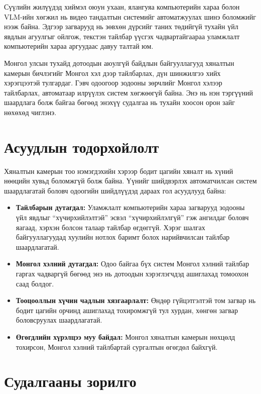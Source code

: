 Сүүлийн жилүүдэд хиймэл оюун ухаан, ялангуяа компьютерийн хараа болон VLM-ийн хөгжил нь видео тандалтын системийг автоматжуулах шинэ боломжийг нээж байна. Эдгээр загварууд нь зөвхөн дүрсийг таних төдийгүй тухайн үйл явдлын агуулгыг ойлгож, текстэн тайлбар үүсгэх чадвартайгаараа уламжлалт компьютерийн хараа аргуудаас давуу талтай юм.

Монгол улсын тухайд дотоодын аюулгүй байдлын байгууллагууд хяналтын камерын бичлэгийг Монгол хэл дээр тайлбарлах, дүн шинжилгээ хийх хэрэгцээтэй тулгардаг. Гэвч одоогоор зодооны зөрчлийг Монгол хэлээр тайлбарлах, автоматаар илрүүлэх систем хөгжөөгүй байна. Энэ нь нэн тэргүүний шаардлага болж байгаа бөгөөд энэхүү судалгаа нь тухайн хоосон орон зайг нөхөхөд чиглэнэ.

\section{Асуудлын тодорхойлолт}

Хяналтын камерын тоо нэмэгдэхийн хэрээр бодит цагийн хяналт нь хүний нөөцийн хувьд боломжгүй болж байна. Үүнийг шийдвэрлэх автоматчилсан систем шаардлагатай боловч одоогийн шийдлүүдэд дараах гол асуудлууд байна:

\begin{itemize}
    \item \textbf{Тайлбарын дутагдал:} Уламжлалт компьютерийн хараа загварууд зодооны үйл явдлыг ``хүчирхийлэлтэй'' эсвэл ``хүчирхийлэлгүй'' гэж ангилдаг боловч яагаад, хэрхэн болсон талаар тайлбар өгдөггүй. Хэрэг шалгах байгууллагуудад хуулийн нотлох баримт болох нарийвчилсан тайлбар шаардлагатай.
        \item \textbf{Монгол хэлний дутагдал:} Одоо байгаа бүх систем Монгол хэлний тайлбар гаргах чадваргүй бөгөөд энэ нь дотоодын хэрэглэгчдэд ашиглахад томоохон саад болдог.
    \item \textbf{Тооцооллын хүчин чадлын хязгаарлалт:} Өндөр гүйцэтгэлтэй том загвар нь бодит цагийн орчинд ашиглахад тохиромжгүй тул хурдан, хөнгөн загвар боловсруулах шаардлагатай.
    \item \textbf{Өгөгдлийн хүрэлцээ муу байдал:} Монгол хяналтын камерын нөхцөлд тохирсон, Монгол хэлний тайлбартай сургалтын өгөгдөл байхгүй.
\end{itemize}

\section{Судалгааны зорилго}

